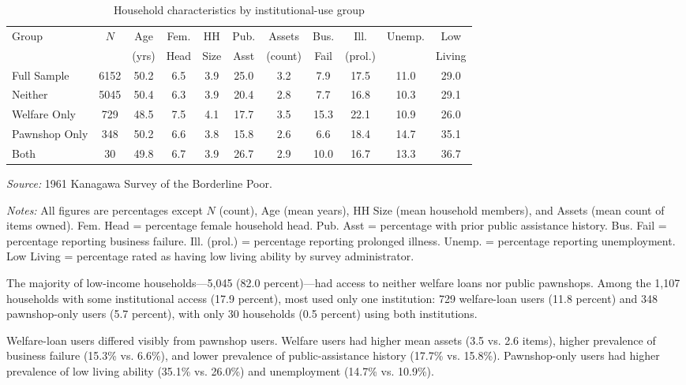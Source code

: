 \documentclass[12pt]{article}
\begin{document}
\begin{table}[htbp]
\centering
\caption{Household characteristics by institutional-use group}
\label{tab:descriptive}
\begin{threeparttable}
\begin{tabular}{@{\extracolsep{6pt}}lcccccccccc@{}}
\toprule
Group & $N$ & Age & Fem. & HH & Pub. & Assets & Bus. & Ill. & Unemp. & Low \\
 &  & (yrs) & Head & Size & Asst & (count) & Fail & (prol.) & & Living \\
\midrule
Full Sample & 6152 & 50.2 & 6.5 & 3.9 & 25.0 & 3.2 & 7.9 & 17.5 & 11.0 & 29.0 \\
Neither & 5045 & 50.4 & 6.3 & 3.9 & 20.4 & 2.8 & 7.7 & 16.8 & 10.3 & 29.1 \\
Welfare Only & 729 & 48.5 & 7.5 & 4.1 & 17.7 & 3.5 & 15.3 & 22.1 & 10.9 & 26.0 \\
Pawnshop Only & 348 & 50.2 & 6.6 & 3.8 & 15.8 & 2.6 & 6.6 & 18.4 & 14.7 & 35.1 \\
Both & 30 & 49.8 & 6.7 & 3.9 & 26.7 & 2.9 & 10.0 & 16.7 & 13.3 & 36.7 \\
\bottomrule
\end{tabular}
\begin{tablenotes}
\small
\item \textit{Source:} 1961 Kanagawa Survey of the Borderline Poor.
\item \textit{Notes:} All figures are percentages except $N$ (count), Age (mean years), HH Size (mean household members), and Assets (mean count of items owned). Fem. Head = percentage female household head. Pub. Asst = percentage with prior public assistance history. Bus. Fail = percentage reporting business failure. Ill. (prol.) = percentage reporting prolonged illness. Unemp. = percentage reporting unemployment. Low Living = percentage rated as having low living ability by survey administrator.
\end{tablenotes}
\end{threeparttable}
\end{table}

The majority of low-income households---5,045 (82.0 percent)---had access to neither welfare loans nor public pawnshops. Among the 1,107 households with some institutional access (17.9 percent), most used only one institution: 729 welfare-loan users (11.8 percent) and 348 pawnshop-only users (5.7 percent), with only 30 households (0.5 percent) using both institutions.

Welfare-loan users differed visibly from pawnshop users. Welfare users had higher mean assets (3.5 vs. 2.6 items), higher prevalence of business failure (15.3\% vs. 6.6\%), and lower prevalence of public-assistance history (17.7\% vs. 15.8\%). Pawnshop-only users had higher prevalence of low living ability (35.1\% vs. 26.0\%) and unemployment (14.7\% vs. 10.9\%).
\end{document}
